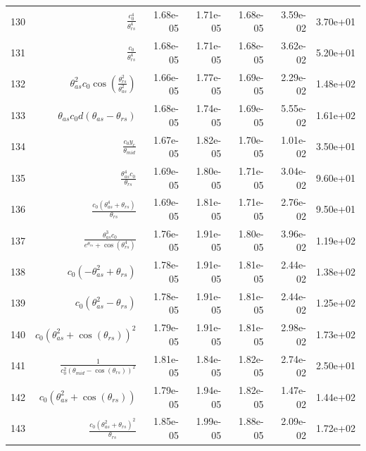 \begin{tabularx}{\textwidth}{lRRRRRl}
130  &  $ \displaystyle\frac{c_{0}^{4}}{\theta_{rs}^{4}} $  &  1.68e-05  &  1.71e-05  &  1.68e-05  &  3.59e-02  &  3.70e+01  \\ 
131  &  $ \displaystyle\frac{c_{0}}{\theta_{rs}^{4}} $  &  1.68e-05  &  1.71e-05  &  1.68e-05  &  3.62e-02  &  5.20e+01  \\ 
132  &  $ \theta_{as}^{2} c_{0} \cos{\left(\displaystyle\frac{\theta_{rs}^{2}}{\theta_{as}^{2}} \right)} $  &  1.66e-05  &  1.77e-05  &  1.69e-05  &  2.29e-02  &  1.48e+02  \\ 
133  &  $ \theta_{as} c_{0} d \left(\theta_{as} - \theta_{rs}\right) $  &  1.68e-05  &  1.74e-05  &  1.69e-05  &  5.55e-02  &  1.61e+02  \\ 
134  &  $ \displaystyle\frac{c_{0} y_c}{\theta_{mid}} $  &  1.67e-05  &  1.82e-05  &  1.70e-05  &  1.01e-02  &  3.50e+01  \\ 
135  &  $ \displaystyle\frac{\theta_{as}^{4} c_{0}}{\theta_{rs}} $  &  1.69e-05  &  1.80e-05  &  1.71e-05  &  3.04e-02  &  9.60e+01  \\ 
136  &  $ \displaystyle\frac{c_{0} \left(\theta_{as}^{4} + \theta_{rs}\right)}{\theta_{rs}} $  &  1.69e-05  &  1.81e-05  &  1.71e-05  &  2.76e-02  &  9.50e+01  \\ 
137  &  $ \displaystyle\frac{\theta_{as}^{3} c_{0}}{e^{\theta_{rs}} + \cos{\left(\theta_{rs}^{4} \right)}} $  &  1.76e-05  &  1.91e-05  &  1.80e-05  &  3.96e-02  &  1.19e+02  \\ 
138  &  $ c_{0} \left(- \theta_{as}^{2} + \theta_{rs}\right) $  &  1.78e-05  &  1.91e-05  &  1.81e-05  &  2.44e-02  &  1.38e+02  \\ 
139  &  $ c_{0} \left(\theta_{as}^{2} - \theta_{rs}\right) $  &  1.78e-05  &  1.91e-05  &  1.81e-05  &  2.44e-02  &  1.25e+02  \\ 
140  &  $ c_{0} \left(\theta_{as}^{2} + \cos{\left(\theta_{rs} \right)}\right)^{2} $  &  1.79e-05  &  1.91e-05  &  1.81e-05  &  2.98e-02  &  1.73e+02  \\ 
141  &  $ \displaystyle\frac{1}{c_{0}^{2} \left(\theta_{mid} - \cos{\left(\theta_{rs} \right)}\right)^{2}} $  &  1.81e-05  &  1.84e-05  &  1.82e-05  &  2.74e-02  &  2.50e+01  \\ 
142  &  $ c_{0} \left(\theta_{as}^{2} + \cos{\left(\theta_{rs} \right)}\right) $  &  1.79e-05  &  1.94e-05  &  1.82e-05  &  1.47e-02  &  1.44e+02  \\ 
143  &  $ \displaystyle\frac{c_{0} \left(\theta_{as}^{2} + \theta_{rs}\right)^{2}}{\theta_{rs}} $  &  1.85e-05  &  1.99e-05  &  1.88e-05  &  2.09e-02  &  1.72e+02  \\ 

\end{tabularx}
